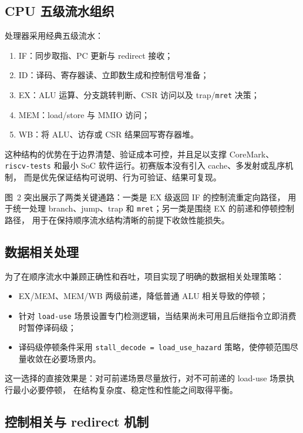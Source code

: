 \subsection{CPU 五级流水组织}

处理器采用经典五级流水：
\begin{enumerate}
    \item IF：同步取指、PC 更新与 redirect 接收；
    \item ID：译码、寄存器读、立即数生成和控制信号准备；
    \item EX：ALU 运算、分支跳转判断、CSR 访问以及 trap/\texttt{mret} 决策；
    \item MEM：load/store 与 MMIO 访问；
    \item WB：将 ALU、访存或 CSR 结果回写寄存器堆。
\end{enumerate}

这种结构的优势在于边界清楚、验证成本可控，并且足以支撑 CoreMark、
\texttt{riscv-tests} 和最小 SoC 软件运行。初赛版本没有引入 cache、多发射或乱序机制，
而是优先保证结构可说明、行为可验证、结果可复现。


图~2 突出展示了两类关键通路：一类是 EX 级返回 IF 的控制流重定向路径，
用于统一处理 branch、jump、trap 和 \texttt{mret}；另一类是围绕 EX 的前递和停顿控制路径，
用于在保持顺序流水结构清晰的前提下收敛性能损失。

\subsection{数据相关处理}

为了在顺序流水中兼顾正确性和吞吐，项目实现了明确的数据相关处理策略：
\begin{itemize}
    \item EX/MEM、MEM/WB 两级前递，降低普通 ALU 相关导致的停顿；
    \item 针对 \texttt{load-use} 场景设置专门检测逻辑，当结果尚未可用且后继指令立即消费时暂停译码级；
    \item 译码级停顿条件采用 \texttt{stall\_decode = load\_use\_hazard} 策略，使停顿范围尽量收敛在必要场景内。
\end{itemize}

这一选择的直接效果是：对可前递场景尽量放行，对不可前递的 load-use 场景执行最小必要停顿，
在结构复杂度、稳定性和性能之间取得平衡。

\subsection{控制相关与 redirect 机制}

